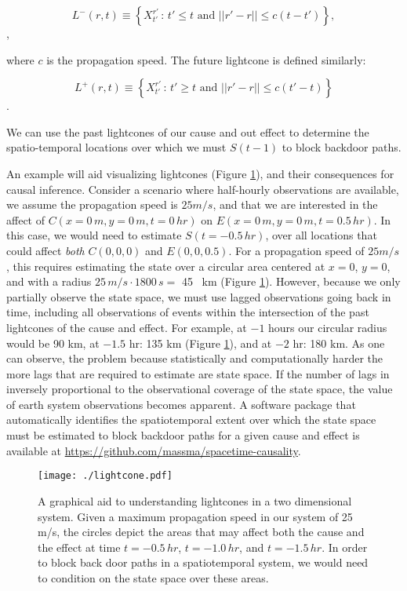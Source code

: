 \documentclass[12pt]{article}
\begin{document}
\begin{equation}
  L^-(r,t) \equiv \left\{ X_{t'}^{r'} \, : \, t' \leq t \text{ and }
    ||r'-r|| \leq c(t-t')\right\},
\end{equation},

where $c$ is the propagation speed. The future lightcone is defined
similarly:

\begin{equation}
  L^+(r,t) \equiv \left\{ X_{t'}^{r'} \, : \, t' \geq t \text{ and }
    ||r'-r|| \leq c(t'-t) \right\}
\end{equation}.

We can use the past lightcones of our cause and out effect to
determine the spatio-temporal locations over which we must $S(t-1)$ to
block backdoor paths.

An example will aid visualizing lightcones (Figure
\ref{fig:lightcone}), and their consequences for causal
inference. Consider a scenario where half-hourly observations are
available, we assume the propagation speed is $25 m/s$, and that we
are interested in the affect of $C(x=0 \, m, y=0 \, m, t=0 \, hr)$ on
$E(x=0 \, m, y=0 \, m , t=0.5 \, hr)$. In this case, we would need to
estimate $S(t=-0.5 \, hr)$, over all locations that could affect
\emph{both} $C(0,0,0)$ and $E(0,0,0.5)$.  For a propagation speed of
$25 m/s$, this requires estimating the state over a circular area
centered at $x=0$, $y=0$, and with a radius
$25 \, m/s \cdot 1800 \, s = $ 45 \, km (Figure
\ref{fig:lightcone}). However, because we only partially observe the
state space, we must use lagged observations going back in time,
including all observations of events within the intersection of the
past lightcones of the cause and effect. For example, at $-1$ hours
our circular radius would be 90 km, at $-1.5$ hr: 135 km (Figure
\ref{fig:lightcone}), and at $-2$ hr: 180 km. As one can observe, the
problem because statistically and computationally harder the more lags
that are required to estimate are state space. If the number of lags
in inversely proportional to the observational coverage of the state
space, the value of earth system observations becomes apparent. A
software package that automatically identifies the spatiotemporal
extent over which the state space must be estimated to block backdoor
paths for a given cause and effect is available at
\url{https://github.com/massma/spacetime-causality}.

\begin{figure}
  \texttt{[image: ./lightcone.pdf]}
  \caption{A graphical aid to understanding lightcones in a two
    dimensional system. Given a maximum propagation speed in our
    system of 25 m/s, the circles depict the areas that may affect
    both the cause and the effect at time $t=-0.5 \, hr$,
    $t=-1.0 \, hr$, and $t=-1.5 \, hr$. In order to block back door
    paths in a spatiotemporal system, we would need to condition on
    the state space over these areas.}
  \label{fig:lightcone}
\end{figure}
\end{document}
